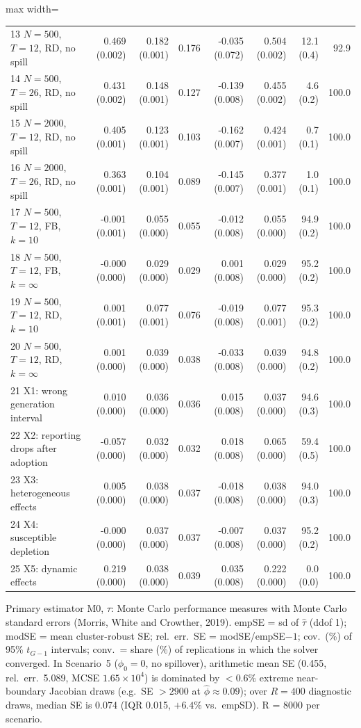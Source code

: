 \begin{table}[!t]
\begin{adjustbox}{max width=\linewidth}
\begin{tabular}{lrrrrrrr}
13 $N=500$, $T=12$, RD, no spill & 0.469 (0.002) & 0.182 (0.001) & 0.176 & -0.035 (0.072) & 0.504 (0.002) & 12.1 (0.4) & 92.9 \\
14 $N=500$, $T=26$, RD, no spill & 0.431 (0.002) & 0.148 (0.001) & 0.127 & -0.139 (0.008) & 0.455 (0.002) & 4.6 (0.2) & 100.0 \\
15 $N=2000$, $T=12$, RD, no spill & 0.405 (0.001) & 0.123 (0.001) & 0.103 & -0.162 (0.007) & 0.424 (0.001) & 0.7 (0.1) & 100.0 \\
16 $N=2000$, $T=26$, RD, no spill & 0.363 (0.001) & 0.104 (0.001) & 0.089 & -0.145 (0.007) & 0.377 (0.001) & 1.0 (0.1) & 100.0 \\
17 $N=500$, $T=12$, FB, $k=10$ & -0.001 (0.001) & 0.055 (0.000) & 0.055 & -0.012 (0.008) & 0.055 (0.000) & 94.9 (0.2) & 100.0 \\
18 $N=500$, $T=12$, FB, $k=\infty$ & -0.000 (0.000) & 0.029 (0.000) & 0.029 & 0.001 (0.008) & 0.029 (0.000) & 95.2 (0.2) & 100.0 \\
19 $N=500$, $T=12$, RD, $k=10$ & 0.001 (0.001) & 0.077 (0.001) & 0.076 & -0.019 (0.008) & 0.077 (0.001) & 95.3 (0.2) & 100.0 \\
20 $N=500$, $T=12$, RD, $k=\infty$ & 0.001 (0.000) & 0.039 (0.000) & 0.038 & -0.033 (0.008) & 0.039 (0.000) & 94.8 (0.2) & 100.0 \\
21 X1: wrong generation interval & 0.010 (0.000) & 0.036 (0.000) & 0.036 & 0.015 (0.008) & 0.037 (0.000) & 94.6 (0.3) & 100.0 \\
22 X2: reporting drops after adoption & -0.057 (0.000) & 0.032 (0.000) & 0.032 & 0.018 (0.008) & 0.065 (0.000) & 59.4 (0.5) & 100.0 \\
23 X3: heterogeneous effects & 0.005 (0.000) & 0.038 (0.000) & 0.037 & -0.018 (0.008) & 0.038 (0.000) & 94.0 (0.3) & 100.0 \\
24 X4: susceptible depletion & -0.000 (0.000) & 0.037 (0.000) & 0.037 & -0.007 (0.008) & 0.037 (0.000) & 95.2 (0.2) & 100.0 \\
25 X5: dynamic effects & 0.219 (0.000) & 0.038 (0.000) & 0.039 & 0.035 (0.008) & 0.222 (0.000) & 0.0 (0.0) & 100.0 \\
\bottomrule
\end{tabular}
\end{adjustbox}
\par\smallskip\parbox{\linewidth}{\scriptsize Primary estimator M0, $\tau$: Monte Carlo performance measures with Monte Carlo standard errors (Morris, White and Crowther, 2019). empSE = sd of $\hat\tau$ (ddof 1); modSE = mean cluster-robust SE; rel.\ err.\ SE = modSE/empSE$-1$; cov.\ (\%) of 95\% $t_{G-1}$ intervals; conv.\ = share (\%) of replications in which the solver converged. In Scenario~5 ($\phi_0=0$, no spillover), arithmetic mean SE (0.455, rel.\ err.\ 5.089, MCSE $1.65\times 10^4$) is dominated by $<0.6\%$ extreme near-boundary Jacobian draws (e.g.\ SE $>2900$ at $\hat\phi\approx 0.09$); over $R=400$ diagnostic draws, median SE is 0.074 (IQR 0.015, $+6.4\%$ vs.\ empSD). R = 8000 per scenario.}
\end{table}
